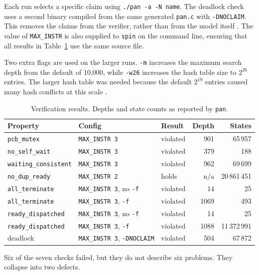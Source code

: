 \documentclass[10pt,a4paper]{article}
\newcommand{\code}[1]{\texttt{#1}}
\begin{document}
Each run selects a specific claim using \code{./pan -a -N name}.
The deadlock check uses a second binary compiled from the same generated 
\code{pan.c} with \code{-DNOCLAIM}. This removes the claims from the verifier,
rather than from the model itself \cite{spin_pan}. The value of 
\code{MAX\_INSTR} is also supplied to \code{spin} on the command line, 
ensuring that all results in Table~\ref{tab:results} use the same source file.

Two extra flags are used on the larger runs. \code{-m} increases the maximum 
search depth from the default of 10,000, while \code{-w26} increases the hash 
table size to $2^{26}$ entries. The larger hash table was needed because the 
default $2^{19}$ entries caused many hash conflicts at this scale 
\cite{spin_pan}.

\begin{table}[htbp]
\centering
\caption{Verification results. Depths and state counts as
reported by \code{pan}.}
\label{tab:results}
\begin{tabular}{l l l r r}
\toprule
\textbf{Property} & \textbf{Config} & \textbf{Result} & \textbf{Depth} & \textbf{States} \\
\midrule
\code{pcb\_mutex} & \code{MAX\_INSTR 3} & violated & 901  & 65\,957 \\
\code{no\_self\_wait} & \code{MAX\_INSTR 3} & violated & 379  & 188 \\
\code{waiting\_consistent} & \code{MAX\_INSTR 3} & violated & 962  & 69\,699 \\
\code{no\_dup\_ready} & \code{MAX\_INSTR 2} & holds    & n/a  & 20\,861\,451 \\
\code{all\_terminate} & \code{MAX\_INSTR 3}, no \code{-f} & violated & 14 & 25 \\
\code{all\_terminate} & \code{MAX\_INSTR 3}, \code{-f} & violated & 1069 & 493 \\
\code{ready\_dispatched} & \code{MAX\_INSTR 3}, no \code{-f} & violated & 14 & 25 \\
\code{ready\_dispatched} & \code{MAX\_INSTR 3}, \code{-f} & violated & 1088 & 11\,372\,991 \\
deadlock & \code{MAX\_INSTR 3}, \code{-DNOCLAIM} & violated & 504 & 67\,872 \\
\bottomrule
\end{tabular}
\end{table}

Six of the seven checks failed, but they do not describe six problems. They
collapse into two defects.
\end{document}
